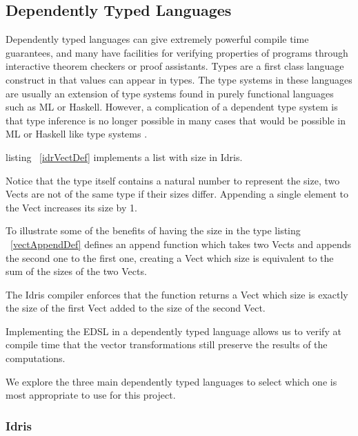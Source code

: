 \subsection{Dependently Typed Languages}

Dependently typed languages can give extremely powerful compile time guarantees, and many have facilities for
verifying properties of programs through interactive theorem checkers or proof assistants. Types are a first class language 
construct in that values can appear in types. The type systems
in these languages are usually an extension of type systems found in purely functional languages such as ML or Haskell.
However, a complication of a dependent type system is that type inference is no longer possible in
many cases that would be possible in ML or Haskell like type systems \cite{practicalDependent}.


listing ~\ref{idrVectDef} implements a list with size in Idris. 


Notice that the type itself contains a natural number to represent the size, 
two Vects are not of the same type if their sizes differ. Appending a single element to the Vect increases
its size by 1.

To illustrate some of the benefits of having the size in the type listing ~\ref{vectAppendDef} defines an append function 
which takes two Vects and appends the second one to the first one, 
creating a Vect which size is equivalent to the sum of the sizes of the two Vects.


The Idris compiler enforces that the function returns a Vect which size is exactly the size of the first Vect 
added to the size of the second Vect.

Implementing the EDSL in a dependently typed language allows us to verify at compile time that the vector
transformations still preserve the results of the computations.

We explore the three main dependently typed languages to select which one is most appropriate to
use for this project.

\subsubsection{Idris}

